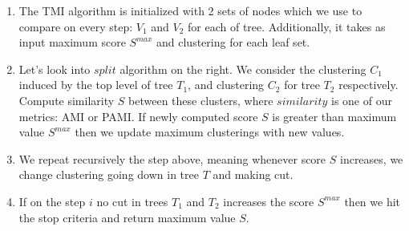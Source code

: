 \documentclass{tum-presentation}
\begin{document}
\begin{frame}
{		\begin{enumerate}
			\item The TMI algorithm is initialized with 2 sets of nodes which we use to compare on every step: $V_1$ and $V_2$ for each of tree. Additionally, it takes as input maximum score $S^{max}$ and clustering for each leaf set.
			\item Let's look into $split$ algorithm on the right. We consider the clustering $C_1$ induced by the top level of tree $T_1$, and clustering $C_2$ for tree $T_2$ respectively. Compute similarity $S$ between these clusters, where $similarity$ is one of our metrics: AMI or PAMI. If newly computed score $S$ is greater than maximum value $S^{max}$ then we update maximum clusterings with new values.
			\item We repeat recursively the step above, meaning whenever score $S$ increases, we change clustering going down in tree $T$ and making cut.
			\item If on the step $i$ no cut in trees $T_1$ and $T_2$ increases the score $S^{max}$ then we hit the stop criteria and return maximum value $S$.
		\end{enumerate}
	}
\end{frame}
\end{document}
